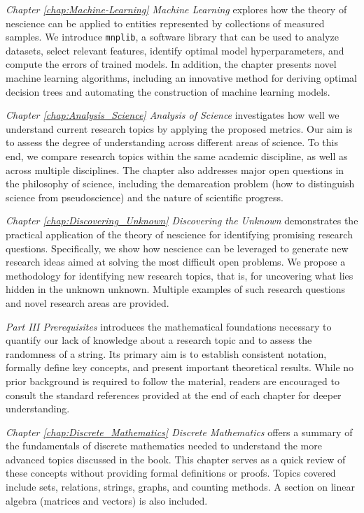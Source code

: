 \emph{Chapter \ref{chap:Machine-Learning} Machine Learning} explores how the theory of nescience can be applied to entities represented by collections of measured samples. We introduce \texttt{mnplib}, a software library that can be used to analyze datasets, select relevant features, identify optimal model hyperparameters, and compute the errors of trained models. In addition, the chapter presents novel machine learning algorithms, including an innovative method for deriving optimal decision trees and automating the construction of machine learning models.

\emph{Chapter \ref{chap:Analysis_Science} Analysis of Science} investigates how well we understand current research topics by applying the proposed metrics. Our aim is to assess the degree of understanding across different areas of science. To this end, we compare research topics within the same academic discipline, as well as across multiple disciplines. The chapter also addresses major open questions in the philosophy of science, including the demarcation problem (how to distinguish science from pseudoscience) and the nature of scientific progress.

\emph{Chapter \ref{chap:Discovering_Unknown} Discovering the Unknown} demonstrates the practical application of the theory of nescience for identifying promising research questions. Specifically, we show how nescience can be leveraged to generate new research ideas aimed at solving the most difficult open problems. We propose a methodology for identifying new research topics, that is, for uncovering what lies hidden in the unknown unknown. Multiple examples of such research questions and novel research areas are provided.

\emph{Part III Prerequisites} introduces the mathematical foundations necessary to quantify our lack of knowledge about a research topic and to assess the randomness of a string. Its primary aim is to establish consistent notation, formally define key concepts, and present important theoretical results. While no prior background is required to follow the material, readers are encouraged to consult the standard references provided at the end of each chapter for deeper understanding.

\emph{Chapter \ref{chap:Discrete_Mathematics} Discrete Mathematics}  offers a summary of the fundamentals of discrete mathematics needed to understand the more advanced topics discussed in the book. This chapter serves as a quick review of these concepts without providing formal definitions or proofs. Topics covered include sets, relations, strings, graphs, and counting methods. A section on linear algebra (matrices and vectors) is also included.

